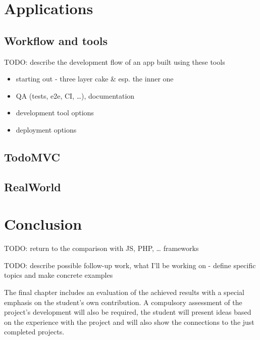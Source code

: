 \documentclass[english,odsaz]{fitthesis}
\begin{document}
\chapter{Applications}
\label{sec:org2418a9d}
\section{Workflow and tools}
\label{sec:org5838504}
TODO: describe the development flow of an app built using these tools

\begin{itemize}
\item starting out - three layer cake \& esp. the inner one
\item QA (tests, e2e, CI, \ldots{}), documentation
\item development tool options
\item deployment options
\end{itemize}

\section{TodoMVC}
\label{sec:org9039ca9}

\section{RealWorld}
\label{sec:org33da4c1}

\chapter{Conclusion}
\label{sec:org3eef492}
TODO: return to the comparison with JS, PHP, \ldots{} frameworks

TODO: describe possible follow-up work, what I'll be working on - define
  specific topics and make concrete examples

The final chapter includes an evaluation of the achieved results with a special
emphasis on the student's own contribution. A compulsory assessment of the
project's development will also be required, the student will present ideas
based on the experience with the project and will also show the connections to
the just completed projects. \cite{Pravidla}

\makeatletter
\def\@openbib@code{\addcontentsline{toc}{chapter}{Bibliography}}
\makeatother

\end{document}
